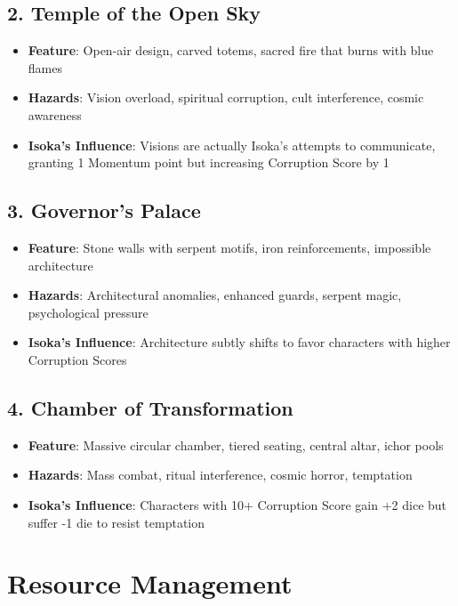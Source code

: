 \documentclass[11pt]{article}
\begin{document}
\subsection{2. Temple of the Open Sky}
\begin{itemize}[leftmargin=*]
    \item \textbf{Feature}: Open-air design, carved totems, sacred fire that burns with blue flames
    \item \textbf{Hazards}: Vision overload, spiritual corruption, cult interference, cosmic awareness
    \item \textbf{Isoka's Influence}: Visions are actually Isoka's attempts to communicate, granting 1 Momentum point but increasing Corruption Score by 1
\end{itemize}

\subsection{3. Governor's Palace}
\begin{itemize}[leftmargin=*]
    \item \textbf{Feature}: Stone walls with serpent motifs, iron reinforcements, impossible architecture
    \item \textbf{Hazards}: Architectural anomalies, enhanced guards, serpent magic, psychological pressure
    \item \textbf{Isoka's Influence}: Architecture subtly shifts to favor characters with higher Corruption Scores
\end{itemize}

\subsection{4. Chamber of Transformation}
\begin{itemize}[leftmargin=*]
    \item \textbf{Feature}: Massive circular chamber, tiered seating, central altar, ichor pools
    \item \textbf{Hazards}: Mass combat, ritual interference, cosmic horror, temptation
    \item \textbf{Isoka's Influence}: Characters with 10+ Corruption Score gain +2 dice but suffer -1 die to resist temptation
\end{itemize}

\newpage

\section{Resource Management}
\end{document}
